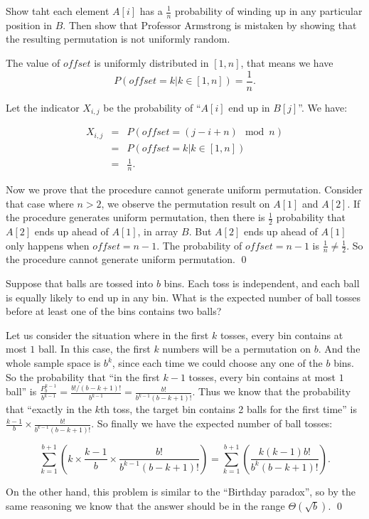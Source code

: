 Show taht each element $A[i]$ has a $\frac{1}{n}$ probability of winding up in any particular position in $B$. Then show that Professor Armstrong is mistaken by showing
that the resulting permutation is not uniformly random.

\answer

The value of $offset$ is uniformly distributed in $[1, n]$, that means we have 
$$P(offset = k| k\in [1, n]) = \frac{1}{n}.$$

Let the indicator $X_{i, j}$ be the probability of ``$A[i]$ end up in $B[j]$''. We have:

\begin{eqnarray*}
X_{i, j} &=& P\left(offset = (j - i + n)\mod n\right)\\
&=& P(offset = k| k\in [1, n])\\
&=& \frac{1}{n}.
\end{eqnarray*}

Now we prove that the procedure cannot generate uniform permutation. Consider that case where $n>2$, we observe the permutation result on $A[1]$ and $A[2]$.
If the procedure generates uniform permutation, then there is $\frac{1}{2}$ probability that $A[2]$ ends up ahead of $A[1]$, in array $B$. But
 $A[2]$ ends up ahead of $A[1]$ only happens when $offset = n - 1$. The probability of $offset = n - 1$ is $\frac{1}{n} \neq \frac{1}{2}$. So the procedure
cannot generate uniform permutation.
\qed


Suppose that balls are tossed into $b$ bins. Each toss is independent, and each ball is equally likely to end up in any bin. What is the expected number of ball tosses
before at least one of the bins contains two balls?

\answer

Let us consider the situation where in the first $k$ tosses, every bin contains at most $1$ ball. In this case, the first $k$ numbers will be a permutation on $b$.
And the whole sample space is $b^k$, since each time we could choose any one of the $b$ bins. So the probability that ``in the first $k - 1$ tosses, every bin contains
at most $1$ ball'' is $\frac{P^{k- 1}_b}{b^{k - 1}} = \frac{b!/(b-k + 1)!}{b^{k - 1}} = \frac{b!}{b^{k - 1}(b-k + 1)!}$. Thus we know that the probability that
``exactly in the $k$th toss, the target bin contains 2 balls for the first time'' is $\frac{k - 1}{b}\times\frac{b!}{b^{k - 1}(b - k + 1)!}$. So finally we have the expected number of ball tosses:

$$\sum_{k = 1}^{b + 1}\left(k\times\frac{k - 1}{b} \times \frac{b!}{b^{k - 1}(b - k + 1)!}\right) = \sum_{k = 1}^{b + 1} \left(\frac{k(k - 1)b!}{b^k(b - k + 1)!}\right).$$

On the other hand, this problem is similar to the ``Birthday paradox'', so by the same reasoning we know that the answer should be in the range $\Theta(\sqrt{b})$.
\qed


